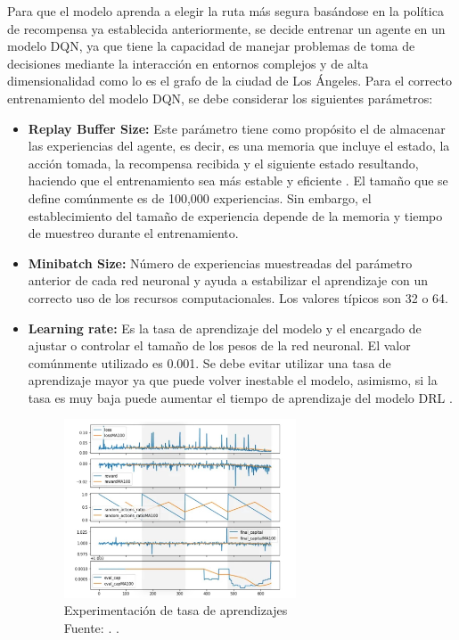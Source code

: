 \begin{itemize}
\begin{itemize}
Para que el modelo aprenda a elegir la ruta más segura basándose en la política de recompensa ya establecida anteriormente, se decide entrenar un agente en un modelo DQN, ya que tiene la capacidad de manejar problemas de toma de decisiones mediante la interacción en entornos complejos y de alta dimensionalidad como lo es el grafo de la ciudad de Los Ángeles. Para el correcto entrenamiento del modelo DQN, se debe considerar los siguientes parámetros:
\begin{itemize}
	\item \textbf{Replay Buffer Size:} Este parámetro tiene como propósito el de almacenar las experiencias del agente, es decir, es una memoria que incluye el estado, la acción tomada, la recompensa recibida y el siguiente estado resultando, haciendo que el entrenamiento sea más estable y eficiente \parencite{gl_ray}. El tamaño que se define comúnmente es de 100,000 experiencias. Sin embargo, el establecimiento del tamaño de experiencia depende de la memoria y tiempo de muestreo durante el entrenamiento.
	\item \textbf{Minibatch Size:} Número de experiencias muestreadas del parámetro anterior de cada red neuronal y ayuda a estabilizar el aprendizaje con un correcto uso de los recursos computacionales. Los valores típicos son 32 o 64.
	\item \textbf{Learning rate:}  Es la tasa de aprendizaje del modelo y el encargado de ajustar o controlar el tamaño de los pesos de la red neuronal. El valor comúnmente utilizado es 0.001. Se debe evitar utilizar una tasa de aprendizaje mayor ya que puede volver inestable el modelo, asimismo, si la tasa es muy baja puede aumentar el tiempo de aprendizaje del modelo DRL \parencite{gl_findin}.
	\medskip
\begin{figure}[h]
	\begin{center}
		\includegraphics[width=0.65\textwidth]{3/figures/learning.jpg}
		\caption[Experimentación de tasa de aprendizajes]{Experimentación de tasa de aprendizajes\\
			Fuente: \citep*{gl_findin}. .}
		\label{1:fig}
	\end{center}
\end{figure}
\medskip
	

\end{itemize}
\end{itemize}
\end{itemize}
